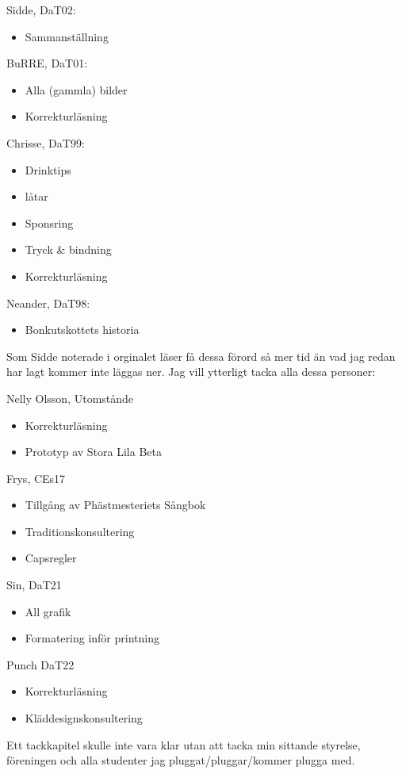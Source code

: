 Sidde, DaT02:
\begin{itemize}
  \item Sammanställning
\end{itemize}
BuRRE, DaT01:
\begin{itemize}
  \item Alla (gammla) bilder
  \item Korrekturläsning
\end{itemize}
Chrisse, DaT99:
\begin{itemize}
  \item Drinktips
  \item låtar
  \item Sponsring
  \item Tryck \& bindning
  \item Korrekturläsning
\end{itemize}
Neander, DaT98:
\begin{itemize}
  \item Bonkutskottets historia
\end{itemize}

Som Sidde noterade i orginalet läser få dessa förord så mer tid än vad jag redan
har lagt kommer inte läggas ner. Jag vill ytterligt tacka alla dessa personer:

Nelly Olsson, Utomstånde
\begin{itemize}
  \item Korrekturläsning
  \item Prototyp av Stora Lila Beta
\end{itemize}
Frys, CEs17
\begin{itemize}
  \item Tillgång av Phästmesteriets Sångbok
  \item Traditionskonsultering
  \item Capsregler
\end{itemize}
Sin, DaT21
\begin{itemize}
  \item All grafik
  \item Formatering inför printning
\end{itemize}
Punch DaT22
\begin{itemize}
  \item Korrekturläsning
  \item Kläddesignskonsultering
\end{itemize}

Ett tackkapitel skulle inte vara klar utan att tacka min sittande styrelse, föreningen och alla studenter jag pluggat/pluggar/kommer plugga med.

